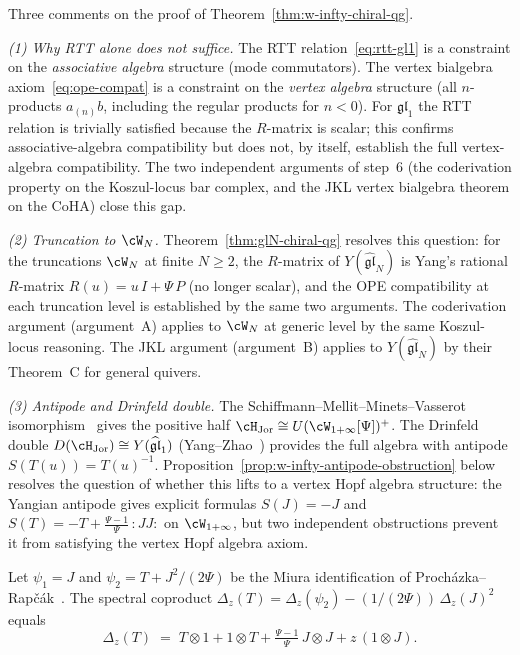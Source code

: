 \begin{remark}
\label{rem:w-infty-vertex-gap}
Three comments on the proof of
Theorem~\textup{\ref{thm:w-infty-chiral-qg}}.

\smallskip
\noindent\emph{(1) Why RTT alone does not suffice.}
The RTT relation~\eqref{eq:rtt-gl1} is a constraint on the
\emph{associative algebra} structure (mode commutators).
The vertex bialgebra axiom~\eqref{eq:ope-compat} is a
constraint on the \emph{vertex algebra} structure (all
$n$-products $a_{(n)}b$, including the regular products for
$n < 0$). For $\mathfrak{gl}_1$ the RTT relation is
trivially satisfied because the $R$-matrix is scalar; this
confirms associative-algebra compatibility but does not, by
itself, establish the full vertex-algebra compatibility.
The two independent arguments of step~6 (the
coderivation property on the Koszul-locus bar complex, and
the JKL vertex bialgebra theorem on the CoHA) close this
gap.

\smallskip
\noindent\emph{(2) Truncation to $\cW_N$.}
Theorem~\ref{thm:glN-chiral-qg} resolves this question:
for the truncations $\cW_N$ at finite $N \geq 2$, the
$R$-matrix of $Y(\widehat{\mathfrak{gl}}_N)$ is Yang's
rational $R$-matrix $R(u) = u\, I + \Psi\, P$ (no longer
scalar), and the OPE compatibility at each truncation level
is established by the same two arguments.
The coderivation argument (argument~A) applies to
$\cW_N$ at generic level by the same Koszul-locus reasoning.
The JKL argument (argument~B) applies to
$Y(\widehat{\mathfrak{gl}}_N)$ by their Theorem~C for
general quivers.

\smallskip
\noindent\emph{(3) Antipode and Drinfeld double.}
The Schiffmann--Mellit--Minets--Vasserot
isomorphism~\cite{SMMV23} gives the positive half
$\cH_{\mathrm{Jor}} \cong U(\cW_{1+\infty}[\Psi])^+$.
The Drinfeld double
$D(\cH_{\mathrm{Jor}}) \cong
Y(\widehat{\mathfrak{gl}}_1)$ (Yang--Zhao~\cite{YZ18a})
provides the full algebra with antipode
$S(T(u)) = T(u)^{-1}$.
Proposition~\ref{prop:w-infty-antipode-obstruction} below
resolves the question of whether this lifts to a
vertex Hopf algebra structure: the Yangian antipode gives
explicit formulas $S(J) = -J$ and
$S(T) = -T + \tfrac{\Psi - 1}{\Psi}\,{:}JJ{:}$ on
$\cW_{1+\infty}$, but two independent obstructions prevent
it from satisfying the vertex Hopf algebra axiom.
\end{remark}

\begin{lemma}
\label{lem:coprod-T-miura}
Let $\psi_1 = J$ and $\psi_2 = T + J^2/(2\Psi)$ be the
Miura identification of
Proch\'azka--Rap\v{c}\'ak~\textup{\cite{PR19}}.
The spectral coproduct
$\Delta_z(T)
= \Delta_z(\psi_2) - (1/(2\Psi))\,\Delta_z(J)^2$
equals
\begin{equation}\label{eq:coprod-T-derived}
  \Delta_z(T)
  \;=\;
  T \otimes 1
  + 1 \otimes T
  + \tfrac{\Psi - 1}{\Psi}\,
  J \otimes J
  + z\,(1 \otimes J).
\end{equation}
\end{lemma}

